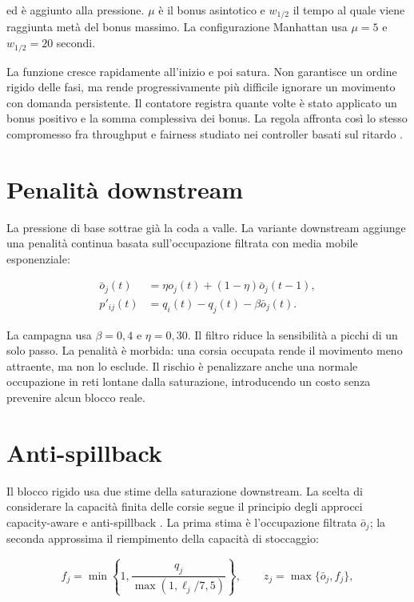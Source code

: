 \documentclass[12pt,a4paper,oneside]{report}
\numberwithin{equation}{chapter}
\begin{document}
ed è aggiunto alla pressione. $\mu$ è il bonus asintotico e $w_{1/2}$ il tempo
al quale viene raggiunta metà del bonus massimo. La configurazione Manhattan
usa $\mu=5$ e $w_{1/2}=20$ secondi.

La funzione cresce rapidamente all'inizio e poi satura. Non garantisce un
ordine rigido delle fasi, ma rende progressivamente più difficile ignorare un
movimento con domanda persistente. Il contatore registra quante volte è stato
applicato un bonus positivo e la somma complessiva dei bonus. La regola affronta
così lo stesso compromesso fra throughput e fairness studiato nei controller
basati sul ritardo \cite{wu2018fairness,liu2022delay}.

\section{Penalità downstream}

La pressione di base sottrae già la coda a valle. La variante downstream
aggiunge una penalità continua basata sull'occupazione filtrata con media
mobile esponenziale:

\begin{align}
    \bar{o}_j(t) &= \eta o_j(t)+(1-\eta)\bar{o}_j(t-1), \\
    p'_{ij}(t) &= q_i(t)-q_j(t)-\beta\bar{o}_j(t).
    \label{eq:downstream-penalty}
\end{align}

La campagna usa $\beta=0{,}4$ e $\eta=0{,}30$. Il filtro riduce la sensibilità
a picchi di un solo passo. La penalità è morbida: una corsia occupata rende il
movimento meno attraente, ma non lo esclude. Il rischio è penalizzare anche una
normale occupazione in reti lontane dalla saturazione, introducendo un costo
senza prevenire alcun blocco reale.

\section{Anti-spillback}

Il blocco rigido usa due stime della saturazione downstream. La scelta di
considerare la capacità finita delle corsie segue il principio degli approcci
capacity-aware e anti-spillback \cite{gregoire2015capacity,noaeen2021spillback}.
La prima stima è l'occupazione filtrata $\bar{o}_j$; la seconda approssima il
riempimento della capacità di stoccaggio:

\begin{equation}
    f_j=\min\left\{1,
    \frac{q_j}{\max(1,\ell_j/7{,}5)}\right\},
    \qquad z_j=\max\{\bar{o}_j,f_j\},
    \label{eq:spillback-score}
\end{equation}
\end{document}
